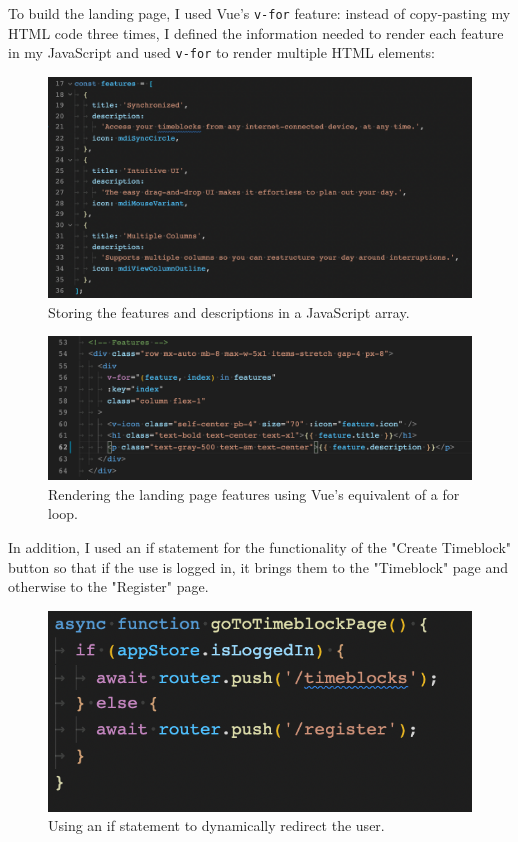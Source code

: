 \documentclass[notitlepage, 12pt]{report}
\newcommand{\code}[1]{\texttt{#1}}
\begin{document}
\newpage

To build the landing page, I used Vue's \code{v-for} feature: instead of copy-pasting my HTML code three times, I defined the information needed to render each feature in my JavaScript and used \code{v-for} to render multiple HTML elements:

\begin{figure}[H]
	\caption{Storing the features and descriptions in a JavaScript array.}
	\includegraphics[width=\textwidth]{landing-page-features.png}
\end{figure}

\begin{figure}[H]
	\caption{Rendering the landing page features using Vue's equivalent of a for loop.}
	\includegraphics[width=\textwidth]{landing-page-v-for.png}
\end{figure}

\newpage

In addition, I used an if statement for the functionality of the "Create Timeblock" button so that if the use is logged in, it brings them to the "Timeblock" page and otherwise to the "Register" page.
\begin{figure}[H]
	\centering
	\caption{Using an if statement to dynamically redirect the user.}
	\includegraphics[width=\textwidth]{landing-page-go-to-timeblock-page.png}
\end{figure}
\end{document}

